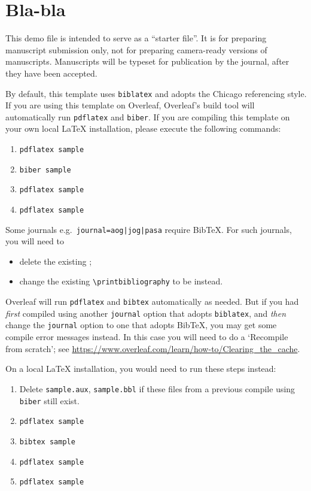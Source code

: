 \documentclass[
  journal=small,
  manuscript=article-type,  %
  year=2020,
  volume=37,
]{cup-journal}
\begin{document}
\section{Bla-bla}

This demo file is intended to serve as a ``starter file''. It is for preparing manuscript submission only, not for preparing camera-ready versions of manuscripts. Manuscripts will be typeset for publication by the journal, after they have been accepted.

By default, this template uses \texttt{biblatex} and adopts the Chicago referencing style. If you are using this template on Overleaf, Overleaf's build tool will automatically run \texttt{pdflatex} and \texttt{biber}. If you are compiling this template on your own local \LaTeX{} installation, please execute the following commands:
\begin{enumerate}
    \item \verb|pdflatex sample|
    \item \verb|biber sample|
    \item \verb|pdflatex sample|
    \item \verb|pdflatex sample|
\end{enumerate}

Some journals e.g.~\texttt{journal=aog|jog|pasa} require Bib\TeX{}. For such journals, you will need to
\begin{itemize}
    \item delete the existing \verb||;
    \item change the existing \verb|\printbibliography| to be \verb|| instead.
\end{itemize} 

Overleaf will run \texttt{pdflatex} and \texttt{bibtex} automatically as needed. But if you had \emph{first} compiled using another \texttt{journal} option that adopts \texttt{biblatex}, and \emph{then} change the \texttt{journal} option to one that adopts Bib\TeX{}, you may get some compile error messages instead. In this case you will need to do a `Recompile from scratch'; see \url{https://www.overleaf.com/learn/how-to/Clearing_the_cache}.

On a local \LaTeX{} installation, you would need to run these steps instead:
\begin{enumerate}
    \item Delete \texttt{sample.aux}, \texttt{sample.bbl} if these files from a previous compile using \texttt{biber} still exist.
    \item \verb|pdflatex sample|
    \item \verb|bibtex sample|
    \item \verb|pdflatex sample|
    \item \verb|pdflatex sample|
\end{enumerate}
\end{document}
